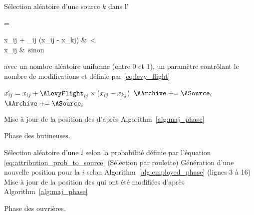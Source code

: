 \begin{algorithm}\label{alg:employed_phase}
  \SetAlgoVlined
  {
    Sélection aléatoire d’une source $k$ dans l’\AArchive\;
    {
      \begin{algomathdisplay}
         =%
          \begin{cases}
            x_{ij} + \ALevyFlight_{ij} \times (x_{ij} - x_{kj}) &\ \ATirage < \AMR \\
            x_{ij}                                      &\ sinon
          \end{cases}
      \end{algomathdisplay}
      avec \ATirage un nombre aléatoire uniforme (entre 0 et 1),
      \AMR un paramètre contrôlant le nombre de modifications
      et \ALevyFlight définie par \eqref{eq:levy_flight}\;
    }
      {
        $\check{x_{ij}} = x_{ij} + \ALevyFlight_{ij} \times (x_{ij} - x_{kj})$\;
      }
    {
      $\AArchive \pluseq \ASource_{i}$\;
    }
    {
      $\AArchive \pluseq \check{\ASource_{i}}$\;
    }
  }
  Mise à jour de la position des \ASources d’après Algorithm~\ref{alg:maj_phase}\;
  \caption{Phase des butineuses.}
\end{algorithm}

\begin{algorithm}\label{alg:onlooker_phase}
  \SetAlgoVlined
  \For{$\ABee \in \AOnlookers$}
    {
      Sélection aléatoire d’une \ASource $i$ selon la probabilité
      définie par l’équation \eqref{eq:attribution_prob_to_source} (Sélection par roulette)\;
      Génération d’une nouvelle position pour la \ASource $i$ selon Algorithm~\ref{alg:employed_phase}
      (lignes 3 à 16)\;
    }
  Mise à jour de la position des \ASources qui ont été modifiées d’après Algorithm~\ref{alg:maj_phase}\;
  \caption{Phase des ouvrières.}
\end{algorithm}

